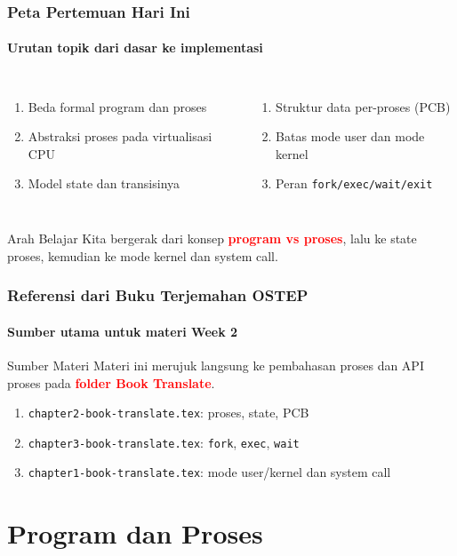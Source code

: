 \documentclass[t,aspectratio=169,xcolor=dvipsnames]{beamer}
\newcommand{\tem}[1]{\textbf{\textcolor{red}{#1}}}
\begin{document}
\begin{frame}
    \frametitle{Peta Pertemuan Hari Ini}
    \framesubtitle{Urutan topik dari dasar ke implementasi}
    \small
    \begin{columns}[T]
        \begin{enumerate}
            \item Beda formal program dan proses
            \item Abstraksi proses pada virtualisasi CPU
            \item Model state dan transisinya
        \end{enumerate}
        \begin{enumerate}
            \item Struktur data per-proses (PCB)
            \item Batas mode user dan mode kernel
            \item Peran \texttt{fork/exec/wait/exit}
        \end{enumerate}
    \end{columns}
    \begin{block}{Arah Belajar}
        Kita bergerak dari konsep \tem{program vs proses}, lalu ke state proses, kemudian ke mode kernel dan system call.
    \end{block}
\end{frame}

\begin{frame}
    \frametitle{Referensi dari Buku Terjemahan OSTEP}
    \framesubtitle{Sumber utama untuk materi Week 2}
    \begin{alertblock}{Sumber Materi}
        Materi ini merujuk langsung ke pembahasan proses dan API proses pada \tem{folder Book Translate}.
    \end{alertblock}
    \vspace{0.1cm}
    \small
    \begin{enumerate}
        \item \texttt{chapter2-book-translate.tex}: proses, state, PCB
        \item \texttt{chapter3-book-translate.tex}: \texttt{fork}, \texttt{exec}, \texttt{wait}
        \item \texttt{chapter1-book-translate.tex}: mode user/kernel dan system call
    \end{enumerate}
\end{frame}

\section{Program dan Proses}
\end{document}
